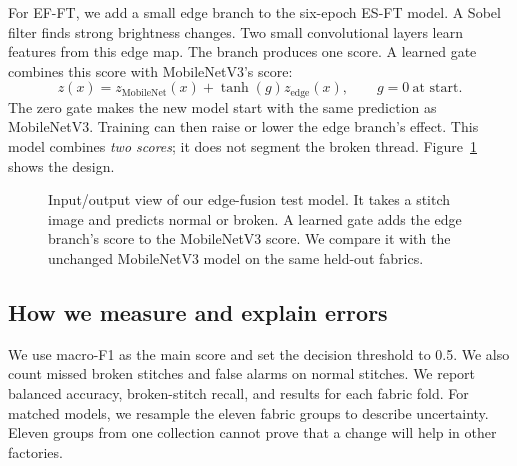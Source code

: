 \documentclass[conference,a4paper]{IEEEtran}
\begin{document}
For EF-FT, we add a small edge branch to the six-epoch ES-FT model. A Sobel filter finds strong brightness changes. Two small convolutional layers learn features from this edge map. The branch produces one score. A learned gate combines this score with MobileNetV3's score:
\begin{equation}
 z(x)=z_{\mathrm{MobileNet}}(x)+\tanh(g)z_{\mathrm{edge}}(x),\qquad g=0\ \text{at start}.
\label{eq:fusion}
\end{equation}
The zero gate makes the new model start with the same prediction as MobileNetV3. Training can then raise or lower the edge branch's effect. This model combines \emph{two scores}; it does not segment the broken thread. Figure~\ref{fig:fusion} shows the design.

\begin{figure}[!t]\centering
{}
\caption{Input/output view of our edge-fusion test model. It takes a stitch image and predicts normal or broken. A learned gate adds the edge branch's score to the MobileNetV3 score. We compare it with the unchanged MobileNetV3 model on the same held-out fabrics.}\label{fig:fusion}
\end{figure}

\subsection{How we measure and explain errors}
We use macro-F1 as the main score and set the decision threshold to 0.5. We also count missed broken stitches and false alarms on normal stitches. We report balanced accuracy, broken-stitch recall, and results for each fabric fold. For matched models, we resample the eleven fabric groups to describe uncertainty. Eleven groups from one collection cannot prove that a change will help in other factories.
\end{document}
